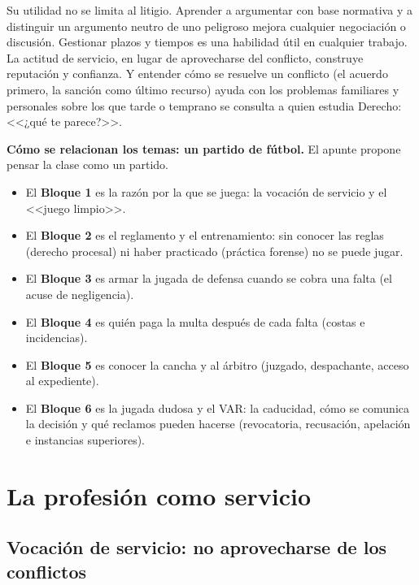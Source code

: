 \documentclass[12pt,oneside]{book}
\begin{document}
Su utilidad no se limita al litigio. Aprender a argumentar con base normativa y a distinguir un argumento neutro de uno peligroso mejora cualquier negociación o discusión. Gestionar plazos y tiempos es una habilidad útil en cualquier trabajo. La actitud de servicio, en lugar de aprovecharse del conflicto, construye reputación y confianza. Y entender cómo se resuelve un conflicto (el acuerdo primero, la sanción como último recurso) ayuda con los problemas familiares y personales sobre los que tarde o temprano se consulta a quien estudia Derecho: <<¿qué te parece?>>.

\begin{note}
\textbf{Cómo se relacionan los temas: un partido de fútbol.} El apunte propone pensar la clase como un partido.
\begin{itemize}
    \item El \textbf{Bloque 1} es la razón por la que se juega: la vocación de servicio y el <<juego limpio>>.
    \item El \textbf{Bloque 2} es el reglamento y el entrenamiento: sin conocer las reglas (derecho procesal) ni haber practicado (práctica forense) no se puede jugar.
    \item El \textbf{Bloque 3} es armar la jugada de defensa cuando se cobra una falta (el acuse de negligencia).
    \item El \textbf{Bloque 4} es quién paga la multa después de cada falta (costas e incidencias).
    \item El \textbf{Bloque 5} es conocer la cancha y al árbitro (juzgado, despachante, acceso al expediente).
    \item El \textbf{Bloque 6} es la jugada dudosa y el VAR: la caducidad, cómo se comunica la decisión y qué reclamos pueden hacerse (revocatoria, recusación, apelación e instancias superiores).
\end{itemize}
\end{note}

\chapter{La profesión como servicio}

\section{Vocación de servicio: no aprovecharse de los conflictos}
\end{document}
